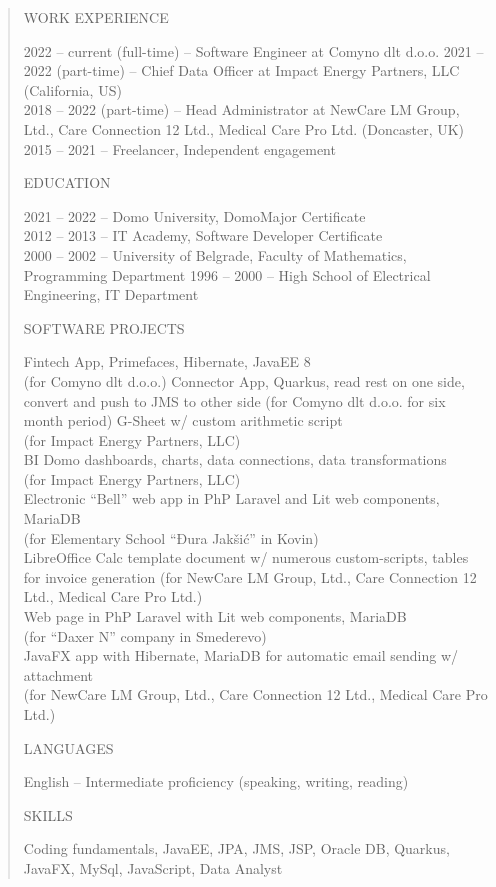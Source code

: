 \documentclass[
]{article}
\begin{document}
\begin{quote}
WORK EXPERIENCE

2022 -- current (full-time) -- Software Engineer at Comyno dlt d.o.o.
2021 -- 2022 (part-time) -- Chief Data Officer at Impact Energy
Partners, LLC (California, US)\\
2018 -- 2022 (part-time) -- Head Administrator at NewCare LM Group,
Ltd., Care Connection 12 Ltd., Medical Care Pro Ltd. (Doncaster, UK)
2015 -- 2021 -- Freelancer, Independent engagement

EDUCATION

2021 -- 2022 -- Domo University, DomoMajor Certificate\\
2012 -- 2013 -- IT Academy, Software Developer Certificate\\
2000 -- 2002 -- University of Belgrade, Faculty of Mathematics,
Programming Department 1996 -- 2000 -- High School of Electrical
Engineering, IT Department

SOFTWARE PROJECTS

Fintech App, Primefaces, Hibernate, JavaEE 8\\
(for Comyno dlt d.o.o.)
Connector App, Quarkus, read rest on one side, convert and push to JMS to other side
(for Comyno dlt d.o.o. for six month period)
G-Sheet w/ custom arithmetic script\\
(for Impact Energy Partners, LLC)\\
BI Domo dashboards, charts, data connections, data transformations\\
(for Impact Energy Partners, LLC)\\
Electronic ``Bell'' web app in PhP Laravel and Lit web components,
MariaDB\\
(for Elementary School ``Đura Jakšić'' in Kovin)\\
LibreOffice Calc template document w/ numerous custom-scripts, tables
for invoice generation (for NewCare LM Group, Ltd., Care Connection 12
Ltd., Medical Care Pro Ltd.)\\
Web page in PhP Laravel with Lit web components, MariaDB\\
(for ``Daxer N'' company in Smederevo)\\
JavaFX app with Hibernate, MariaDB for automatic email sending w/
attachment\\
(for NewCare LM Group, Ltd., Care Connection 12 Ltd., Medical Care Pro
Ltd.)

LANGUAGES

English -- Intermediate proficiency (speaking, writing, reading)

SKILLS

Coding fundamentals, JavaEE, JPA, JMS, JSP, Oracle DB, Quarkus, JavaFX, MySql, JavaScript, Data Analyst
\end{quote}
\end{document}
